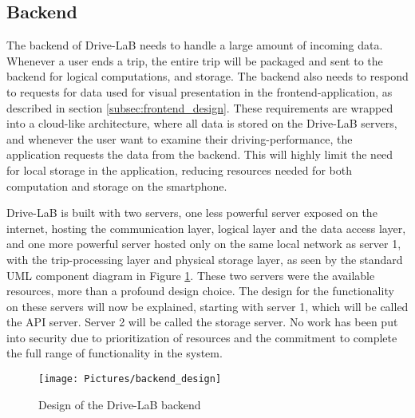 \subsection{Backend}\label{subsec:backend_design}
The backend of Drive-LaB needs to handle a large amount of incoming data. Whenever a user ends a trip, the entire trip will be packaged and sent to the backend for logical computations, and storage. The backend also needs to respond to requests for data used for visual presentation in the frontend-application, as described in section \ref{subsec:frontend_design}. These requirements are wrapped into a cloud-like architecture, where all data is stored on the Drive-LaB servers, and whenever the user want to examine their driving-performance, the application requests the data from the backend. This will highly limit the need for local storage in the application, reducing resources needed for both computation and storage on the smartphone. 

Drive-LaB is built with two servers, one less powerful server exposed on the internet, hosting the communication layer, logical layer and the data access layer, and one more powerful server hosted only on the same local network as server 1, with the trip-processing layer and physical storage layer, as seen by the standard UML component diagram in Figure \ref{fig:backend_design}. These two servers were the available resources, more than a profound design choice. The design for the functionality on these servers will now be explained, starting with server 1, which will be called the API server. Server 2 will be called the storage server. No work has been put into security due to prioritization of resources and the commitment to complete the full range of functionality in the system.

\begin{figure}[tb]
\centering
\texttt{[image: Pictures/backend\_design]}
\caption{Design of the Drive-LaB backend}
\label{fig:backend_design}
\end{figure}